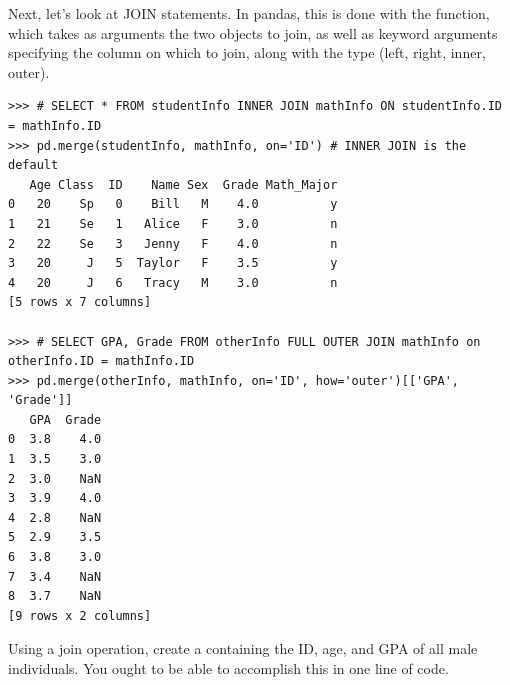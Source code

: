 Next, let's look at JOIN statements. In pandas, this is done with the  function,
which takes as arguments the two  objects to join, as well as keyword arguments specifying
the column on which to join, along with the type (left, right, inner, outer).

\begin{lstlisting}
>>> # SELECT * FROM studentInfo INNER JOIN mathInfo ON studentInfo.ID = mathInfo.ID
>>> pd.merge(studentInfo, mathInfo, on='ID') # INNER JOIN is the default
   Age Class  ID    Name Sex  Grade Math_Major
0   20    Sp   0    Bill   M    4.0          y
1   21    Se   1   Alice   F    3.0          n
2   22    Se   3   Jenny   F    4.0          n
3   20     J   5  Taylor   F    3.5          y
4   20     J   6   Tracy   M    3.0          n
[5 rows x 7 columns]

>>> # SELECT GPA, Grade FROM otherInfo FULL OUTER JOIN mathInfo on otherInfo.ID = mathInfo.ID
>>> pd.merge(otherInfo, mathInfo, on='ID', how='outer')[['GPA', 'Grade']]
   GPA  Grade
0  3.8    4.0
1  3.5    3.0
2  3.0    NaN
3  3.9    4.0
4  2.8    NaN
5  2.9    3.5
6  3.8    3.0
7  3.4    NaN
8  3.7    NaN
[9 rows x 2 columns]
\end{lstlisting}

\begin{problem}
Using a join operation, create a  containing the ID, age, and GPA of all male individuals.
You ought to be able to accomplish this in one line of code.
\end{problem}

